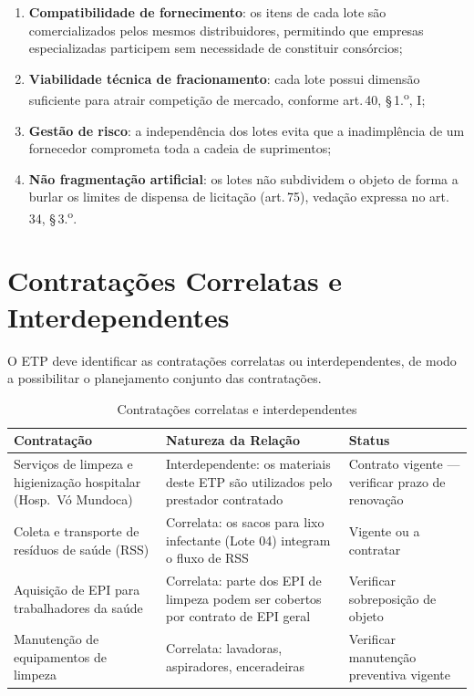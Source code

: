 \documentclass[12pt,a4paper]{article}
\newcommand{\art}[1]{art.\,#1}
\begin{document}
\begin{enumerate}
  \item \textbf{Compatibilidade de fornecimento}: os itens de cada lote são
    comercializados pelos mesmos distribuidores, permitindo que empresas especializadas
    participem sem necessidade de constituir consórcios;
  \item \textbf{Viabilidade técnica de fracionamento}: cada lote possui dimensão
    suficiente para atrair competição de mercado, conforme \art{40},
    \S\,1.\textsuperscript{o}, I;
  \item \textbf{Gestão de risco}: a independência dos lotes evita que a inadimplência
    de um fornecedor comprometa toda a cadeia de suprimentos;
  \item \textbf{Não fragmentação artificial}: os lotes não subdividem o objeto de forma
    a burlar os limites de dispensa de licitação (\art{75}), vedação expressa no
    \art{34}, \S\,3.\textsuperscript{o}.
\end{enumerate}

\section{Contratações Correlatas e Interdependentes}

\begin{legalbox}[Base Legal --- \art{18}, VI, Lei n.\textsuperscript{o} 14.133/2021]
\small
O ETP deve identificar as contratações correlatas ou interdependentes, de modo a
possibilitar o planejamento conjunto das contratações.
\end{legalbox}

\begin{table}[H]
\centering
\caption{Contratações correlatas e interdependentes}
\label{tab:correlatas}
\small{}
\begin{tabular}{p{5.2cm}p{4.4cm}p{4.0cm}}
  \rowcolor{navyblue}
  \color{white}\textbf{Contratação} &
  \color{white}\textbf{Natureza da Relação} &
  \color{white}\textbf{Status} \\
  \toprule
  Serviços de limpeza e higienização hospitalar (Hosp.\ Vó Mundoca) &
    Interdependente: os materiais deste ETP são utilizados pelo prestador contratado &
    Contrato vigente --- verificar prazo de renovação \\
  Coleta e transporte de resíduos de saúde (RSS) &
    Correlata: os sacos para lixo infectante (Lote 04) integram o fluxo de RSS &
    Vigente ou a contratar \\
  Aquisição de EPI para trabalhadores da saúde &
    Correlata: parte dos EPI de limpeza podem ser cobertos por contrato de EPI geral &
    Verificar sobreposição de objeto \\
  Manutenção de equipamentos de limpeza & Correlata: lavadoras, aspiradores, enceradeiras &
    Verificar manutenção preventiva vigente \\
  \bottomrule
\end{tabular}
\end{table}
\end{document}
